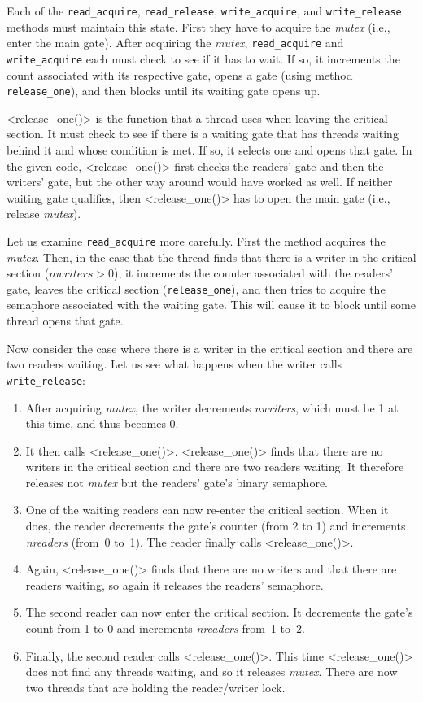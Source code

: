 \documentclass{report}
\begin{document}
{Each of the
\texttt{read\_acquire}, \texttt{read\_release},
\texttt{write\_acquire}, and \texttt{write\_release} methods must maintain
this state.
First they have to acquire the \textit{mutex}
(i.e., enter the main gate).
After acquiring the \textit{mutex},
\texttt{read\_acquire} and \texttt{write\_acquire} each must check to see
if it has to wait.
If so, it increments the count associated with its respective gate,
opens a gate (using method \texttt{release\_one}), and then blocks until
its waiting gate opens up.

<{release_one()}> is the function that a thread uses when leaving
the critical section.  It must check to see if there is a waiting gate
that has threads waiting behind it and whose condition is met.
If so, it selects one and opens that gate.  In the given code,
<{release_one()}> first checks the readers' gate and then the
writers' gate, but the other way around would have worked as well.
If neither waiting gate qualifies, then <{release_one()}> 
has to open the main gate (i.e., release \textit{mutex}).

Let us examine \texttt{read\_acquire} more carefully.
First the method acquires the \textit{mutex}.
Then, in the case that the thread
finds that there is a writer in the critical section
($\mathit{nwriters > 0}$), it increments the counter associated with
the readers' gate, leaves the critical section (\texttt{release\_one}),
and then tries to acquire the semaphore associated with the waiting gate.
This will cause it to block until some thread opens that gate.

Now consider the case where there is a writer in the critical
section and there are two readers waiting.  Let us see what happens when
the writer calls \texttt{write\_release}:
\begin{enumerate}
\item After acquiring \textit{mutex}, the writer decrements
\textit{nwriters}, which must be 1 at this time, and thus becomes 0.
\item It then calls <{release_one()}>.
<{release_one()}> finds that there are no writers in the critical section
and there are two readers waiting.  It therefore releases not
\textit{mutex} but the readers' gate's binary semaphore.
\item One of the waiting readers can now re-enter the critical section.
When it does, the reader decrements the gate's counter (from 2 to 1)
and increments \textit{nreaders} (from~0 to~1).
The reader finally calls <{release_one()}>.
\item Again, <{release_one()}> finds that there are no writers and
that there are readers waiting, so again it releases the readers' semaphore.
\item The second reader can now enter the critical section.
It decrements the gate's count from 1 to 0 and increments \textit{nreaders}
from~1 to~2.
\item Finally, the second reader  calls <{release_one()}>.
This time <{release_one()}> does not find any threads waiting,
and so it releases \textit{mutex}.
There are now two threads that are holding the reader/writer lock.
\end{enumerate}

}
\end{document}
